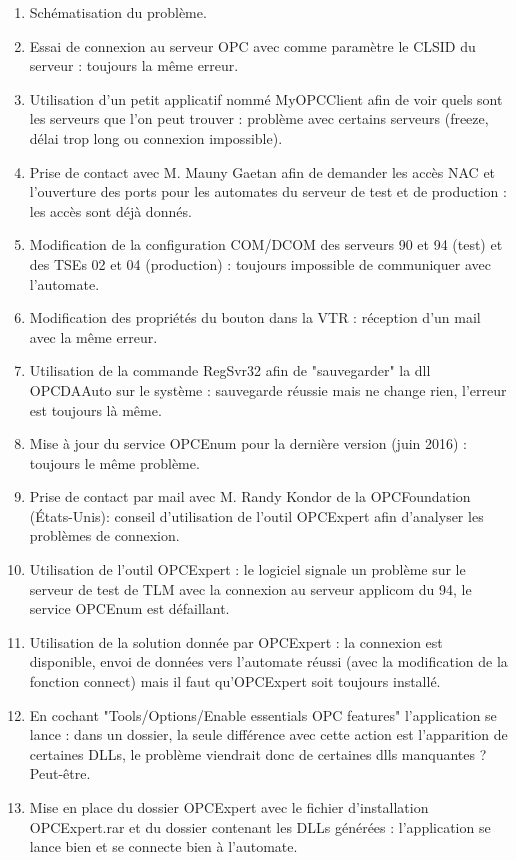 \documentclass[a4paper,12pt]{extarticle}
\begin{document}
\begin{enumerate}[-]
	\item Schématisation du problème.
	\item Essai de connexion au serveur OPC avec comme paramètre le CLSID du serveur : toujours la même erreur.
	\item Utilisation d'un petit applicatif nommé MyOPCClient afin de voir quels sont les serveurs que l'on peut trouver : problème avec certains serveurs (freeze, délai trop long ou connexion impossible).
	\item Prise de contact avec M. Mauny Gaetan afin de demander les accès NAC et l'ouverture des ports pour les automates du serveur de test et de production : les accès sont déjà donnés.
	\item Modification de la configuration COM/DCOM des serveurs 90 et 94 (test) et des TSEs 02 et 04 (production) : toujours impossible de communiquer avec l'automate.
	\item Modification des propriétés du bouton dans la VTR : réception d’un mail avec la même erreur.
	\item Utilisation de la commande RegSvr32 afin de "sauvegarder" la dll OPCDAAuto sur le système : sauvegarde réussie mais ne change rien, l'erreur est toujours là même.
	\item Mise à jour du service OPCEnum pour la dernière version (juin 2016) : toujours le même problème.
	\item Prise de contact par mail avec M. Randy Kondor de la OPCFoundation (États-Unis): conseil d'utilisation de l'outil OPCExpert afin d'analyser les problèmes de connexion.
	\item Utilisation de l'outil OPCExpert : le logiciel signale un problème sur le serveur de test de TLM avec la connexion au serveur applicom du 94, le service OPCEnum est défaillant.
	\item Utilisation de la solution donnée par OPCExpert : la connexion est disponible, envoi de données vers l'automate réussi (avec la modification de la fonction connect) mais il faut qu’OPCExpert soit toujours installé.
	\item En cochant "Tools/Options/Enable essentials OPC features" l'application se lance : dans un dossier, la seule différence avec cette action est l'apparition de certaines DLLs, le problème viendrait donc de certaines dlls manquantes ? Peut-être.
	\item Mise en place du dossier OPCExpert avec le fichier d'installation OPCExpert.rar et du dossier contenant les DLLs générées : l’application se lance bien et se connecte bien à l’automate.
\end{enumerate}
\end{document}

